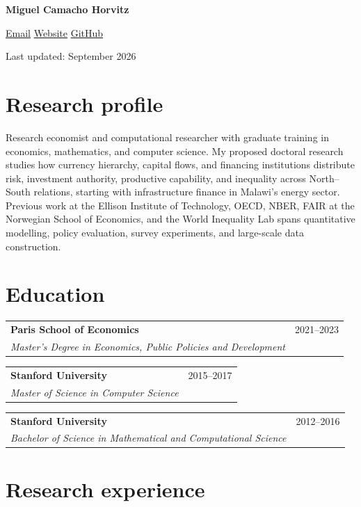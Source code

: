 \documentclass[10pt,letterpaper]{article}
\makeatletter
\newcommand{\cvrole}[4]{%
  \begin{tabularx}{\textwidth}{@{}>{\raggedright\arraybackslash}X>{\raggedleft\arraybackslash}p{1.5in}@{}}
    \textbf{\color{ink}#1} & \small{#2} \\
    \textit{#3} & \hfill\makebox[0pt][r]{\textit{\small{#4}}}
  \end{tabularx}
  \vspace{0pt}
}
\makeatother
\begin{document}
\fontsize{9}{10.8}\selectfont

\begin{center}
{\fontsize{25}{28}\selectfont\bfseries\color{ink} Miguel Camacho Horvitz}\par
\vspace{10pt}
\href{mailto:camacho.horvitz@gmail.com}{Email}
\hspace{0.8em}{\color{rule}$\vert$}\hspace{0.8em}
\href{https://mkmacho.github.io}{Website}
\hspace{0.8em}{\color{rule}$\vert$}\hspace{0.8em}
\href{https://github.com/mkmacho}{GitHub}\par
\vspace{7pt}
{\small\color{muted}Last updated: September 2026}
\end{center}

\section{Research profile}

Research economist and computational researcher with graduate training in economics, mathematics, and computer science. My proposed doctoral research studies how currency hierarchy, capital flows, and financing institutions distribute risk, investment authority, productive capability, and inequality across North--South relations, starting with infrastructure finance in Malawi's energy sector. Previous work at the Ellison Institute of Technology, OECD, NBER, FAIR at the Norwegian School of Economics, and the World Inequality Lab spans quantitative modelling, policy evaluation, survey experiments, and large-scale data construction.


\section{Education}

\cvrole{Paris School of Economics}{2021--2023}{Master's Degree in Economics, Public Policies and Development}{Paris, France}

\cvrole{Stanford University}{2015--2017}{Master of Science in Computer Science}{Stanford, CA, USA}

\cvrole{Stanford University}{2012--2016}{Bachelor of Science in Mathematical and Computational Science}{Stanford, CA, USA}

\section{Research experience}
\end{document}
